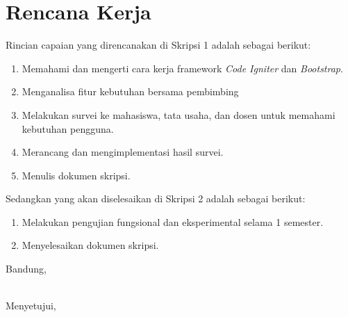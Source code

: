 \documentclass[a4paper,twoside]{article}
\begin{document}
\section{Rencana Kerja}


Rincian capaian yang direncanakan di Skripsi 1 adalah sebagai berikut:
\begin{enumerate}
	\item Memahami dan mengerti cara kerja framework \textit{Code Igniter} dan \textit{Bootstrap}.
	\item Menganalisa fitur kebutuhan bersama pembimbing
	\item Melakukan survei ke mahasiswa, tata usaha, dan dosen untuk memahami kebutuhan pengguna.
	\item Merancang dan mengimplementasi hasil survei.
	\item Menulis dokumen skripsi.
\end{enumerate}

Sedangkan yang akan diselesaikan di Skripsi 2 adalah sebagai berikut:
\begin{enumerate}
	\item Melakukan pengujian fungsional dan eksperimental selama 1 semester. 
	\item Menyelesaikan dokumen skripsi.
\end{enumerate}


\newpage
\vspace{1cm}
\centering Bandung, \tanggal\\
\vspace{2cm} \nama \\ 
\vspace{1cm}


Menyetujui, \\
\end{document}
